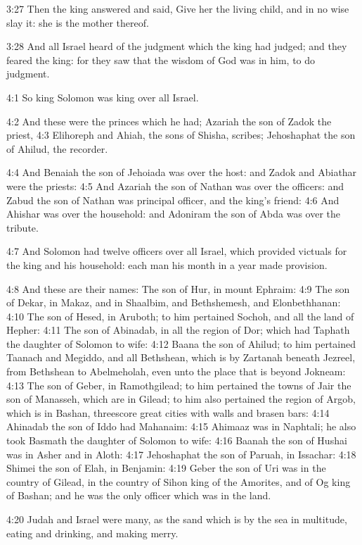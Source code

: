3:27 Then the king answered and said, Give her the living child, and
in no wise slay it: she is the mother thereof.

3:28 And all Israel heard of the judgment which the king had judged;
and they feared the king: for they saw that the wisdom of God was in
him, to do judgment.

4:1 So king Solomon was king over all Israel.

4:2 And these were the princes which he had; Azariah the son of Zadok
the priest, 4:3 Elihoreph and Ahiah, the sons of Shisha, scribes;
Jehoshaphat the son of Ahilud, the recorder.

4:4 And Benaiah the son of Jehoiada was over the host: and Zadok and
Abiathar were the priests: 4:5 And Azariah the son of Nathan was over
the officers: and Zabud the son of Nathan was principal officer, and
the king's friend: 4:6 And Ahishar was over the household: and
Adoniram the son of Abda was over the tribute.

4:7 And Solomon had twelve officers over all Israel, which provided
victuals for the king and his household: each man his month in a year
made provision.

4:8 And these are their names: The son of Hur, in mount Ephraim: 4:9
The son of Dekar, in Makaz, and in Shaalbim, and Bethshemesh, and
Elonbethhanan: 4:10 The son of Hesed, in Aruboth; to him pertained
Sochoh, and all the land of Hepher: 4:11 The son of Abinadab, in all
the region of Dor; which had Taphath the daughter of Solomon to wife:
4:12 Baana the son of Ahilud; to him pertained Taanach and Megiddo,
and all Bethshean, which is by Zartanah beneath Jezreel, from
Bethshean to Abelmeholah, even unto the place that is beyond Jokneam:
4:13 The son of Geber, in Ramothgilead; to him pertained the towns of
Jair the son of Manasseh, which are in Gilead; to him also pertained
the region of Argob, which is in Bashan, threescore great cities with
walls and brasen bars: 4:14 Ahinadab the son of Iddo had Mahanaim:
4:15 Ahimaaz was in Naphtali; he also took Basmath the daughter of
Solomon to wife: 4:16 Baanah the son of Hushai was in Asher and in
Aloth: 4:17 Jehoshaphat the son of Paruah, in Issachar: 4:18 Shimei
the son of Elah, in Benjamin: 4:19 Geber the son of Uri was in the
country of Gilead, in the country of Sihon king of the Amorites, and
of Og king of Bashan; and he was the only officer which was in the
land.

4:20 Judah and Israel were many, as the sand which is by the sea in
multitude, eating and drinking, and making merry.

